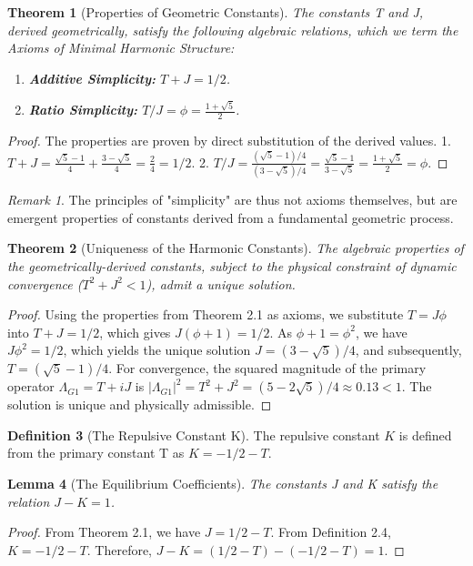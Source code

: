 \documentclass{article}
\theoremstyle{plain}
\newtheorem{theorem}{Theorem}[section]
\newtheorem{lemma}[theorem]{Lemma}
\theoremstyle{definition}
\newtheorem{definition}[theorem]{Definition}
\theoremstyle{remark}
\newtheorem*{remark}{Remark}
\begin{document}
\begin{theorem}[Properties of Geometric Constants]
The constants T and J, derived geometrically, satisfy the following algebraic relations, which we term the Axioms of Minimal Harmonic Structure:
\begin{enumerate}
    \item \textbf{Additive Simplicity:} $T+J = 1/2$.
    \item \textbf{Ratio Simplicity:} $T/J = \phi = \frac{1+\sqrt{5}}{2}$.
\end{enumerate}
\end{theorem}
\begin{proof}
The properties are proven by direct substitution of the derived values.
1. $T+J = \frac{\sqrt{5}-1}{4} + \frac{3-\sqrt{5}}{4} = \frac{2}{4} = 1/2$.
2. $T/J = \frac{(\sqrt{5}-1)/4}{(3-\sqrt{5})/4} = \frac{\sqrt{5}-1}{3-\sqrt{5}} = \frac{1+\sqrt{5}}{2} = \phi$.
\end{proof}

\begin{remark}
The principles of "simplicity" are thus not axioms themselves, but are emergent properties of constants derived from a fundamental geometric process.
\end{remark}

\begin{theorem}[Uniqueness of the Harmonic Constants]
The algebraic properties of the geometrically-derived constants, subject to the physical constraint of dynamic convergence ($T^2+J^2 < 1$), admit a unique solution.
\end{theorem}
\begin{proof}
Using the properties from Theorem 2.1 as axioms, we substitute $T=J\phi$ into $T+J=1/2$, which gives $J(\phi+1)=1/2$. As $\phi+1=\phi^2$, we have $J\phi^2=1/2$, which yields the unique solution $J=(3-\sqrt{5})/4$, and subsequently, $T=(\sqrt{5}-1)/4$. For convergence, the squared magnitude of the primary operator $\Lambda_{G1} = T+iJ$ is $|\Lambda_{G1}|^2 = T^2+J^2 = (5-2\sqrt{5})/4 \approx 0.13 < 1$. The solution is unique and physically admissible.
\end{proof}

\begin{definition}[The Repulsive Constant K]
The repulsive constant $K$ is defined from the primary constant T as $K = -1/2 - T$.
\end{definition}

\begin{lemma}[The Equilibrium Coefficients]
The constants J and K satisfy the relation $J-K=1$.
\end{lemma}
\begin{proof}
From Theorem 2.1, we have $J = 1/2 - T$. From Definition 2.4, $K = -1/2 - T$.
Therefore, $J-K = (1/2 - T) - (-1/2 - T) = 1$.
\end{proof}
\end{document}
